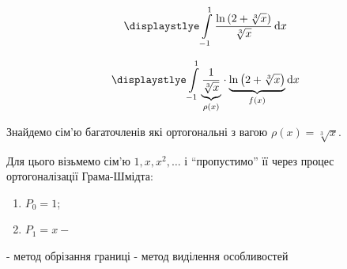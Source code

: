 ﻿\[\displaystlye\int\limits_{-1}^1 \frac{\ln \left(2 + \sqrt[3]{x}\right)}{\sqrt[3]{x}}\,\mathrm{d}x\]

\[\displaystlye\int\limits_{-1}^1 \underset{\rho(x)}{\underbrace{\frac{1}{\sqrt[3]{x}}}} \cdot \underset{f(x)}{\underbrace{\ln \left(2 + \sqrt[3]{x}\right)}} \, \mathrm{d}x\]

Знайдемо сім'ю багаточленів які ортогональні з вагою $\rho(x) = \sqrt[3]{x}$. \medskip

Для цього візьмемо сім'ю $1, x, x^2, \ldots$ і ``пропустимо'' її через процес ортогоналізації Грама-Шмідта: \newline

\begin{enumerate}
	\item $P_0 = 1$;

	\item $P_1 = x - \frac{}{}$
\end{enumerate}



- метод обрізання границі
- метод виділення особливостей
